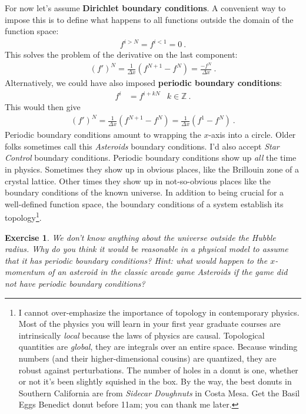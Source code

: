 \documentclass[
  11pt,
	colorful,
	raggedright,
]{tufte-style-thesis-flip}
\newtheorem{exercise}{Exercise}[section]
\begin{document}
%
For now let’s assume \textbf{Dirichlet boundary conditions}. A convenient way to impose this is to define what happens to all functions outside the domain of the function space:
\begin{align}
  f^{i > N} = f^{i < 1} = 0 \ .
\end{align}
This solves the problem of the derivative on the last component:
\begin{align}
  {(f')}^N = \frac{1}{\Delta x}(f^{N+1} - f^N) 
  = 
  \frac{- f^N}{\Delta x}  \ .
\end{align}
Alternatively, we could have also imposed \textbf{periodic boundary conditions}:
\begin{align}
  f^{i} &= f^{i+ kN}
  & k\in \mathbb{Z} \ .
\end{align}
This would then give
\begin{align}
  {(f')}^N = \frac{1}{\Delta x}(f^{N+1} - f^N) 
  = 
  \frac{1}{\Delta x}(f^{1} - f^N) 
  \ .
\end{align}
Periodic boundary conditions amount to wrapping the $x$-axis into a circle. Older folks sometimes call this \emph{Asteroids} boundary conditions. I'd also accept \emph{Star Control} boundary conditions. Periodic boundary conditions show up \emph{all} the time in physics. Sometimes they show up in obvious places, like the Brillouin zone of a crystal lattice. Other times they show up in not-so-obvious places like the boundary conditions of the known universe. In addition to being crucial for a well-defined function space, the boundary conditions of a system establish its topology\footnote{I cannot over-emphasize the importance of topology in contemporary physics. Most of the physics you will learn in your first year graduate courses are intrinsically \emph{local} because the laws of physics are causal. Topological quantities are \emph{global}, they are integrals over an entire space. Because winding numbers (and their higher-dimensional cousins) are quantized, they are robust against perturbations. The number of holes in a donut is one, whether or not it's been slightly squished in the box. By the way, the best donuts in Southern California are from \emph{Sidecar Doughnuts} in Costa Mesa. Get the Basil Eggs Benedict donut before 11am; you can thank me later.}.

\begin{exercise}
We don't know anything about the universe outside the Hubble radius. Why do you think it would be reasonable in a physical model to \emph{assume} that it has periodic boundary conditions? Hint: what would happen to the $x$-momentum of an asteroid in the classic arcade game \emph{Asteroids} if the game did not have periodic boundary conditions? 
\end{exercise}
\end{document}
